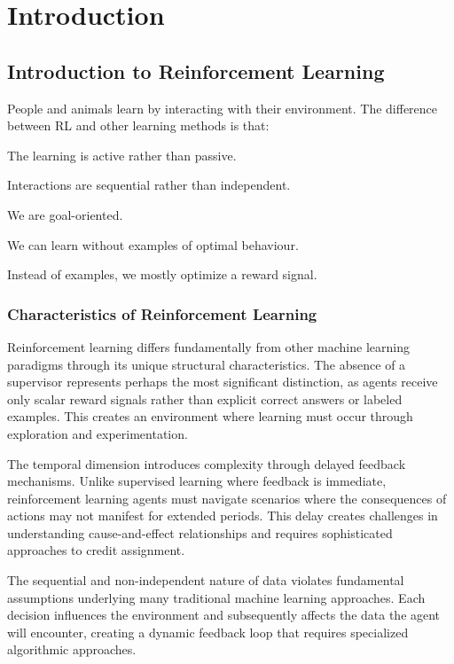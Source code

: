 \chapter{Introduction}

\section{Introduction to Reinforcement Learning}

People and animals learn by interacting with their environment. The difference between RL and other learning methods is that:
\begin{compactitemize}
\item The learning is active rather than passive.
\item Interactions are sequential rather than independent.
\item We are goal-oriented.
\item We can learn without examples of optimal behaviour.
\item Instead of examples, we mostly optimize a reward signal.
\end{compactitemize}


\subsection{Characteristics of Reinforcement Learning}

    Reinforcement learning differs fundamentally from other machine learning paradigms through its unique structural characteristics. The absence of a supervisor represents perhaps the most significant distinction, as agents receive only scalar reward signals rather than explicit correct answers or labeled examples. This creates an environment where learning must occur through exploration and experimentation.
    
    The temporal dimension introduces complexity through delayed feedback mechanisms. Unlike supervised learning where feedback is immediate, reinforcement learning agents must navigate scenarios where the consequences of actions may not manifest for extended periods. This delay creates challenges in understanding cause-and-effect relationships and requires sophisticated approaches to credit assignment.
    
    The sequential and non-independent nature of data violates fundamental assumptions underlying many traditional machine learning approaches. Each decision influences the environment and subsequently affects the data the agent will encounter, creating a dynamic feedback loop that requires specialized algorithmic approaches.


